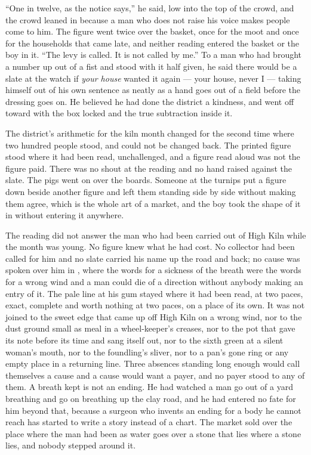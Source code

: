 “One in twelve, as the notice says,” he said, low into the top of the crowd, and the crowd leaned in because a man who does not raise his voice makes people come to him. The figure went twice over the basket, once for the moot and once for the households that came late, and neither reading entered the basket or the boy in it. “The levy is called. It is not called by me.” To a man who had brought a number up out of a fist and stood with it half given, he said there would be a slate at the watch if \emph{your house} wanted it again --- your house, never I --- taking himself out of his own sentence as neatly as a hand goes out of a field before the dressing goes on. He believed he had done the district a kindness, and went off toward  with the box locked and the true subtraction inside it.

The district's arithmetic for the kiln month changed for the second time where two hundred people stood, and could not be changed back. The printed figure stood where it had been read, unchallenged, and a figure read aloud was not the figure paid. There was no shout at the reading and no hand raised against the slate. The pigs went on over the boards. Someone at the turnips put a figure down beside another figure and left them standing side by side without making them agree, which is the whole art of a market, and the boy took the shape of it in without entering it anywhere.

\scenebreak

The reading did not answer the man who had been carried out of High Kiln while the month was young. No figure knew what he had cost. No collector had been called for him and no slate carried his name up the road and back; no cause was spoken over him in , where the words for a sickness of the breath were the words for a wrong wind and a man could die of a direction without anybody making an entry of it. The pale line at his gum stayed where it had been read, at two paces, exact, complete and worth nothing at two paces, on a place of its own. It was not joined to the sweet edge that came up off High Kiln on a wrong wind, nor to the dust ground small as meal in a wheel-keeper's creases, nor to the pot that gave its note before its time and sang itself out, nor to the sixth green at a silent woman's mouth, nor to the foundling's sliver, nor to a pan's gone ring or any empty place in a returning line. Three absences standing long enough would call themselves a cause and a cause would want a payer, and no payer stood to any of them. A breath kept is not an ending. He had watched a man go out of a yard breathing and go on breathing up the clay road, and he had entered no fate for him beyond that, because a surgeon who invents an ending for a body he cannot reach has started to write a story instead of a chart. The market sold over the place where the man had been as water goes over a stone that lies where a stone lies, and nobody stepped around it.

